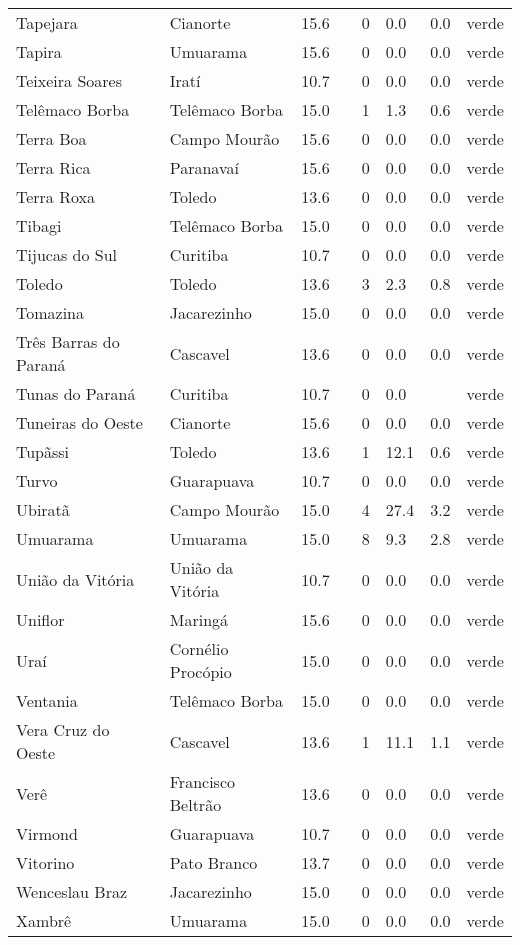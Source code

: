 \begin{longtable}{l|lllllll}
  Tapejara & Cianorte & 15.6 &  & 0 & 0.0 & 0.0 & verde \\ 
  Tapira & Umuarama & 15.6 &  & 0 & 0.0 & 0.0 & verde \\ 
  Teixeira Soares & Iratí & 10.7 &  & 0 & 0.0 & 0.0 & verde \\ 
  Telêmaco Borba & Telêmaco Borba & 15.0 &  & 1 & 1.3 & 0.6 & verde \\ 
  Terra Boa & Campo Mourão & 15.6 &  & 0 & 0.0 & 0.0 & verde \\ 
  Terra Rica & Paranavaí & 15.6 &  & 0 & 0.0 & 0.0 & verde \\ 
  Terra Roxa & Toledo & 13.6 &  & 0 & 0.0 & 0.0 & verde \\ 
  Tibagi & Telêmaco Borba & 15.0 &  & 0 & 0.0 & 0.0 & verde \\ 
  Tijucas do Sul & Curitiba & 10.7 &  & 0 & 0.0 & 0.0 & verde \\ 
  Toledo & Toledo & 13.6 &  & 3 & 2.3 & 0.8 & verde \\ 
  Tomazina & Jacarezinho & 15.0 &  & 0 & 0.0 & 0.0 & verde \\ 
  Três Barras do Paraná & Cascavel & 13.6 &  & 0 & 0.0 & 0.0 & verde \\ 
  Tunas do Paraná & Curitiba & 10.7 &  & 0 & 0.0 &  & verde \\ 
  Tuneiras do Oeste & Cianorte & 15.6 &  & 0 & 0.0 & 0.0 & verde \\ 
  Tupãssi & Toledo & 13.6 &  & 1 & 12.1 & 0.6 & verde \\ 
  Turvo & Guarapuava & 10.7 &  & 0 & 0.0 & 0.0 & verde \\ 
  Ubiratã & Campo Mourão & 15.0 &  & 4 & 27.4 & 3.2 & verde \\ 
  Umuarama & Umuarama & 15.0 &  & 8 & 9.3 & 2.8 & verde \\ 
  União da Vitória & União da Vitória & 10.7 &  & 0 & 0.0 & 0.0 & verde \\ 
  Uniflor & Maringá & 15.6 &  & 0 & 0.0 & 0.0 & verde \\ 
  Uraí & Cornélio Procópio & 15.0 &  & 0 & 0.0 & 0.0 & verde \\ 
  Ventania & Telêmaco Borba & 15.0 &  & 0 & 0.0 & 0.0 & verde \\ 
  Vera Cruz do Oeste & Cascavel & 13.6 &  & 1 & 11.1 & 1.1 & verde \\ 
  Verê & Francisco Beltrão & 13.6 &  & 0 & 0.0 & 0.0 & verde \\ 
  Virmond & Guarapuava & 10.7 &  & 0 & 0.0 & 0.0 & verde \\ 
  Vitorino & Pato Branco & 13.7 &  & 0 & 0.0 & 0.0 & verde \\ 
  Wenceslau Braz & Jacarezinho & 15.0 &  & 0 & 0.0 & 0.0 & verde \\ 
  Xambrê & Umuarama & 15.0 &  & 0 & 0.0 & 0.0 & verde \\ 
  \hline
\end{longtable}
